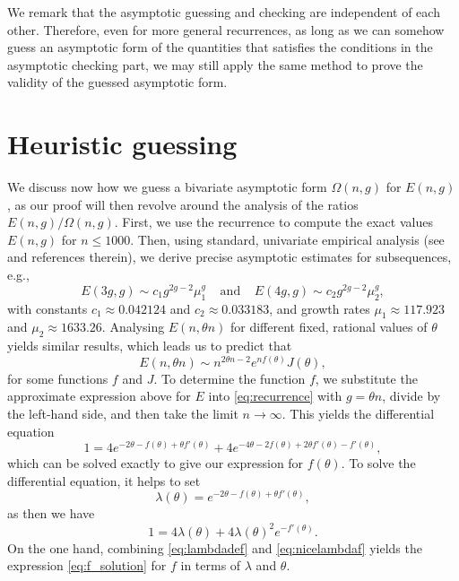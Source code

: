 \documentclass[a4paper,12pt]{article}
\theoremstyle{definition}
\newcommand{\E}{E}
\begin{document}
We remark that the asymptotic guessing and checking are independent of each other. Therefore, even for more general recurrences, as long as we can somehow guess an asymptotic form of the quantities that satisfies the conditions in the asymptotic checking part, we may still apply the same method to prove the validity of the guessed asymptotic form.





\section{Heuristic guessing} \label{sec:guessing}

We discuss now how we guess a bivariate asymptotic form $\Omega(n,g)$ for $E(n,g)$, as our proof will then revolve around the analysis of the ratios $E(n,g)/\Omega(n,g)$. 
First, we use the recurrence to compute the exact values $E(n,g)$ for $n\leq 1000$. Then, using standard, univariate empirical analysis (see \cite{guttmannser} and references therein), we derive precise asymptotic estimates for subsequences, e.g.,
\[\E(3g,g)\sim c_{1}g^{2g-2}\mu_{1}^{g}~~~~~\text{and}~~~~~\E(4g,g)\sim c_{2}g^{2g-2}\mu_{2}^{g},\]
with constants $c_{1}\approx 0.042124$ and $c_{2}\approx0.033183$, and growth rates $\mu_{1}\approx 117.923$ and $\mu_{2}\approx 1633.26$. Analysing $\E(n,\theta n)$ for different fixed, rational values of $\theta$ yields similar results, which leads us to predict that
\[\E(n,\theta n)\sim n^{2\theta n-2}e^{nf(\theta)}{J}\left(\theta\right),\]
for some functions $f$ and $J$. 
To determine the function $f$, we substitute the approximate expression above for $\E$ into \eqref{eq:recurrence} with $g=\theta n$, divide by the left-hand side, and then take the limit $n\to\infty$. This yields the differential equation
\[1=4e^{-2\theta-f(\theta)+\theta f'(\theta)}+4e^{-4\theta-2f(\theta)+2\theta f'(\theta)-f'(\theta)},\]
which can be solved exactly to give our expression for $f(\theta)$. To solve the differential equation, it helps to set 
\begin{equation}
    \label{eq:lambdadef}
    \lambda(\theta) = e^{-2\theta-f(\theta)+\theta f'(\theta)},
\end{equation}
as then we have
\begin{equation}
    \label{eq:nicelambdaf}
    1=4\lambda(\theta)+4\lambda(\theta)^{2}e^{-f'(\theta)}.
\end{equation}
On the one hand, combining \eqref{eq:lambdadef} and \eqref{eq:nicelambdaf} yields the expression \eqref{eq:f_solution} for $f$ in terms of $\lambda$ and $\theta$.
\end{document}
